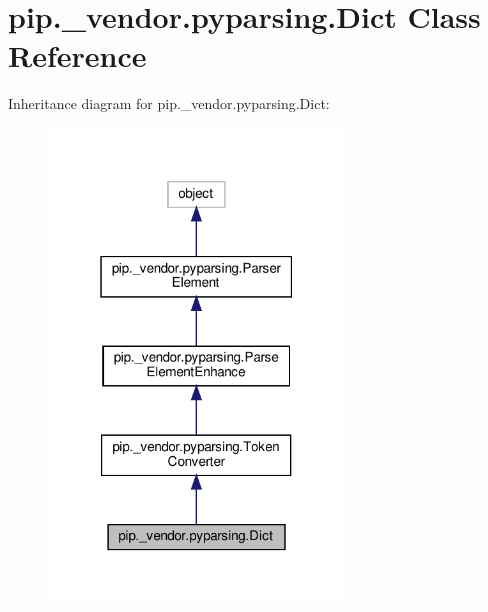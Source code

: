 \hypertarget{classpip_1_1__vendor_1_1pyparsing_1_1Dict}{}\section{pip.\+\_\+vendor.\+pyparsing.\+Dict Class Reference}
\label{classpip_1_1__vendor_1_1pyparsing_1_1Dict}


Inheritance diagram for pip.\+\_\+vendor.\+pyparsing.\+Dict\+:
\nopagebreak
\begin{figure}[H]
\begin{center}
\leavevmode
\includegraphics[width=223pt]{classpip_1_1__vendor_1_1pyparsing_1_1Dict__inherit__graph}
\end{center}
\end{figure}


